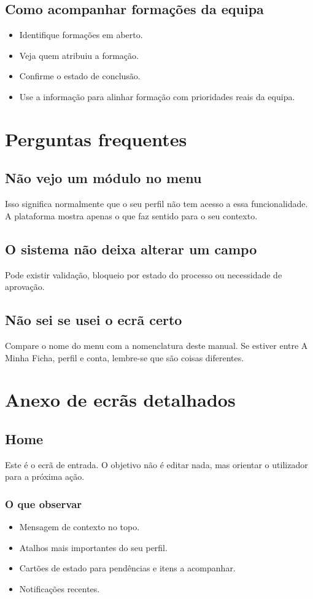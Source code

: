 \section{Como acompanhar formações da equipa}
\begin{itemize}
  \item Identifique formações em aberto.
  \item Veja quem atribuiu a formação.
  \item Confirme o estado de conclusão.
  \item Use a informação para alinhar formação com prioridades reais da equipa.
\end{itemize}

\chapter{Perguntas frequentes}
\section{Não vejo um módulo no menu}
Isso significa normalmente que o seu perfil não tem acesso a essa funcionalidade. A plataforma mostra apenas o que faz sentido para o seu contexto.

\section{O sistema não deixa alterar um campo}
Pode existir validação, bloqueio por estado do processo ou necessidade de aprovação.

\section{Não sei se usei o ecrã certo}
Compare o nome do menu com a nomenclatura deste manual. Se estiver entre A Minha Ficha, perfil e conta, lembre-se que são coisas diferentes.

\chapter{Anexo de ecrãs detalhados}
\section{Home}
Este é o ecrã de entrada. O objetivo não é editar nada, mas orientar o utilizador para a próxima ação.

\subsection{O que observar}
\begin{itemize}
  \item Mensagem de contexto no topo.
  \item Atalhos mais importantes do seu perfil.
  \item Cartões de estado para pendências e itens a acompanhar.
  \item Notificações recentes.
\end{itemize}


